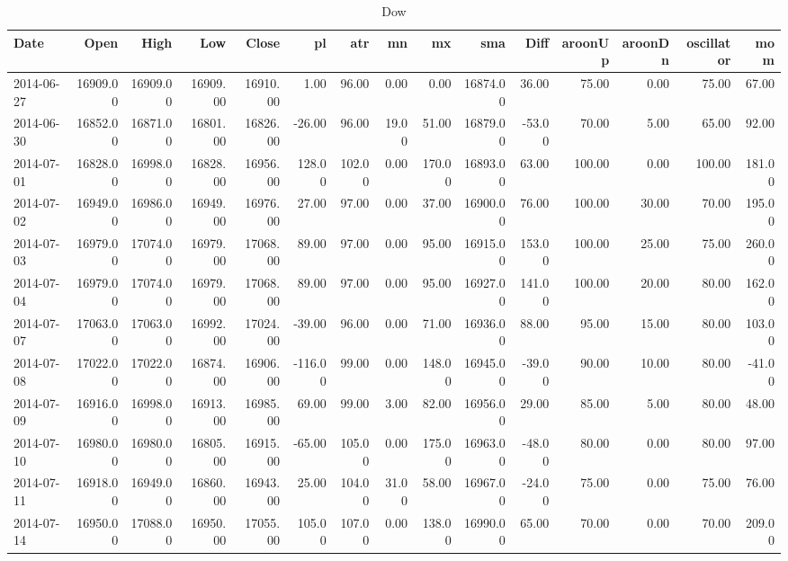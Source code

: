 \documentclass{article}
\begin{document}
\begin{table}[ht]
\centering
\caption{Dow} 
\begin{tabular}{lrrrrrrrrrrrrrr}
  \hline
Date & Open & High & Low & Close & pl & atr & mn & mx & sma & Diff & aroonUp & aroonDn & oscillator & mom \\ 
  \hline
2014-06-27 & 16909.00 & 16909.00 & 16909.00 & 16910.00 & 1.00 & 96.00 & 0.00 & 0.00 & 16874.00 & 36.00 & 75.00 & 0.00 & 75.00 & 67.00 \\ 
  2014-06-30 & 16852.00 & 16871.00 & 16801.00 & 16826.00 & -26.00 & 96.00 & 19.00 & 51.00 & 16879.00 & -53.00 & 70.00 & 5.00 & 65.00 & 92.00 \\ 
  2014-07-01 & 16828.00 & 16998.00 & 16828.00 & 16956.00 & 128.00 & 102.00 & 0.00 & 170.00 & 16893.00 & 63.00 & 100.00 & 0.00 & 100.00 & 181.00 \\ 
  2014-07-02 & 16949.00 & 16986.00 & 16949.00 & 16976.00 & 27.00 & 97.00 & 0.00 & 37.00 & 16900.00 & 76.00 & 100.00 & 30.00 & 70.00 & 195.00 \\ 
  2014-07-03 & 16979.00 & 17074.00 & 16979.00 & 17068.00 & 89.00 & 97.00 & 0.00 & 95.00 & 16915.00 & 153.00 & 100.00 & 25.00 & 75.00 & 260.00 \\ 
  2014-07-04 & 16979.00 & 17074.00 & 16979.00 & 17068.00 & 89.00 & 97.00 & 0.00 & 95.00 & 16927.00 & 141.00 & 100.00 & 20.00 & 80.00 & 162.00 \\ 
  2014-07-07 & 17063.00 & 17063.00 & 16992.00 & 17024.00 & -39.00 & 96.00 & 0.00 & 71.00 & 16936.00 & 88.00 & 95.00 & 15.00 & 80.00 & 103.00 \\ 
  2014-07-08 & 17022.00 & 17022.00 & 16874.00 & 16906.00 & -116.00 & 99.00 & 0.00 & 148.00 & 16945.00 & -39.00 & 90.00 & 10.00 & 80.00 & -41.00 \\ 
  2014-07-09 & 16916.00 & 16998.00 & 16913.00 & 16985.00 & 69.00 & 99.00 & 3.00 & 82.00 & 16956.00 & 29.00 & 85.00 & 5.00 & 80.00 & 48.00 \\ 
  2014-07-10 & 16980.00 & 16980.00 & 16805.00 & 16915.00 & -65.00 & 105.00 & 0.00 & 175.00 & 16963.00 & -48.00 & 80.00 & 0.00 & 80.00 & 97.00 \\ 
  2014-07-11 & 16918.00 & 16949.00 & 16860.00 & 16943.00 & 25.00 & 104.00 & 31.00 & 58.00 & 16967.00 & -24.00 & 75.00 & 0.00 & 75.00 & 76.00 \\ 
  2014-07-14 & 16950.00 & 17088.00 & 16950.00 & 17055.00 & 105.00 & 107.00 & 0.00 & 138.00 & 16990.00 & 65.00 & 70.00 & 0.00 & 70.00 & 209.00 \\ 

\end{tabular}
\end{table}
\end{document}
